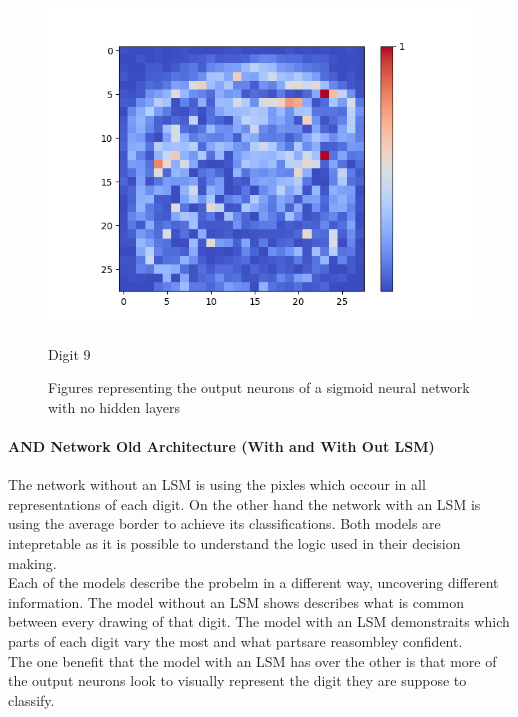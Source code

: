 \begin{figure}[H]
\begin{minipage}[b]{0.19\textwidth}
		\includegraphics[width=\textwidth]{Sigmoid(NO-Hidden)/Layer0-Neuron-9.png}
		\caption{Digit 9}
	\end{minipage}
	\hfill
	\caption{Figures representing the output neurons of a sigmoid neural network with no hidden layers}
\end{figure}


\paragraph{AND Network Old Architecture (With and With Out LSM)}
The network without an LSM is using the pixles which occour in all representations of each digit. On the other hand the network with an LSM is using the average border to achieve its classifications. Both models are intepretable as it is possible to understand the logic used in their decision making.\\

Each of the models describe the probelm in a different way, uncovering different information. The model without an LSM shows describes what is common between every drawing of that digit. The model with an LSM demonstraits which parts of each digit vary the most and what partsare reasombley confident.\\

The one benefit that the model with an LSM has over the other is that more of the output neurons look to visually represent the digit they are suppose to classify.

